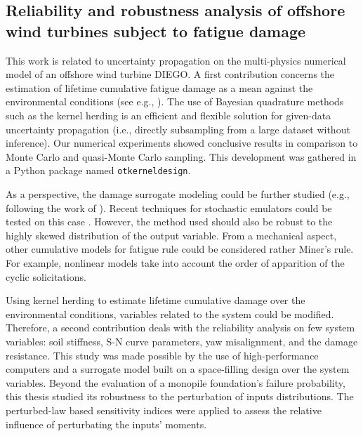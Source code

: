 \subsection*{Reliability and robustness analysis of offshore wind turbines subject to fatigue damage}

This work is related to uncertainty propagation on the multi-physics numerical model of an offshore wind turbine DIEGO. 
A first contribution concerns the estimation of lifetime cumulative fatigue damage as a mean against the environmental conditions (see e.g., \citealp{muller_cheng_2018}). 
The use of Bayesian quadrature methods such as the kernel herding \citep{chen_welling_2010,husar_duvenaud_2012} is an efficient and flexible solution for given-data uncertainty propagation (i.e., directly subsampling from a large dataset without inference). 
Our numerical experiments showed conclusive results in comparison to Monte Carlo and quasi-Monte Carlo sampling. 
This development was gathered in a Python package named \texttt{otkerneldesign}. 

As a perspective, the damage surrogate modeling could be further studied (e.g., following the work of \citealp{slot_sorensen_2020}). 
Recent techniques for stochastic emulators could be tested on this case \citep{baker_2022_stochastic_surrogates_review,zhu_2023_stochastic_pce,luthen_2023_stochastic_pce}.
However, the method used should also be robust to the highly skewed distribution of the output variable. 
From a mechanical aspect, other cumulative models for fatigue rule could be considered rather Miner's rule. 
For example, nonlinear models \citep{rocher_2020_nonlinear_fatigue} take into account the order of apparition of the cyclic solicitations.  

Using kernel herding to estimate lifetime cumulative damage over the environmental conditions, variables related to the system could be modified. 
Therefore, a second contribution deals with the reliability analysis on few system variables: soil stiffness, S-N curve parameters, yaw misalignment, and the damage resistance.   
This study was made possible by the use of high-performance computers and a surrogate model built on a space-filling design over the system variables. 
Beyond the evaluation of a monopile foundation's failure probability, this thesis studied its robustness to the perturbation of inputs distributions.  
The perturbed-law based sensitivity indices \citep{lemaitre_2015_PLI} were applied to assess the relative influence of perturbating the inputs' moments. 

